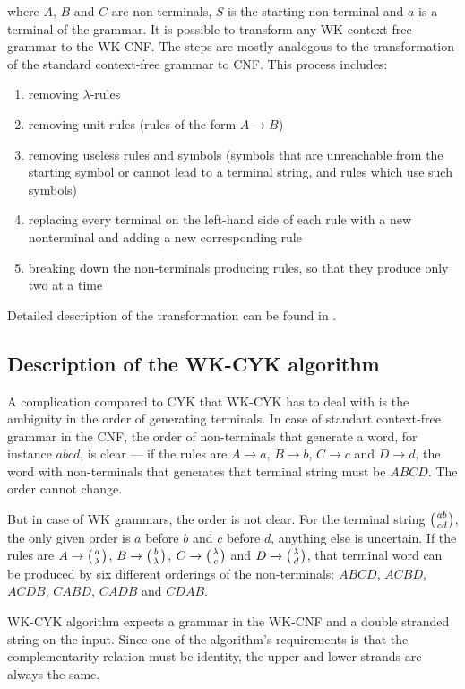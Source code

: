 where $A$, $B$ and $C$ are non-terminals, $S$ is the starting non-terminal and $a$ is a terminal of the grammar. It is possible to transform any WK context-free grammar to the WK-CNF. The steps are mostly analogous to the transformation of the standard context-free grammar to CNF. This process includes:

\begin{enumerate}
  \item{removing $\lambda$-rules}
  \item{removing unit rules (rules of the form $A \rightarrow B$)}
  \item{removing useless rules and symbols (symbols that are unreachable from the starting symbol or cannot lead to a terminal string, and rules which use such symbols)}
  \item{replacing every terminal on the left-hand side of each rule with a new nonterminal and adding a new corresponding rule}
  \item{breaking down the non-terminals producing rules, so that they produce only two at a time}
\end{enumerate}

Detailed description of the transformation can be found in \cite{WK_CYK}.

\subsection{Description of the WK-CYK algorithm}
A complication compared to CYK that WK-CYK has to deal with is the ambiguity in the order of generating terminals. In case of standart context-free grammar in the CNF, the order of non-terminals that generate a word, for instance $abcd$, is clear --- if the rules are $A \rightarrow a$, $B \rightarrow b$, $C \rightarrow c$ and $D \rightarrow d$, the word with non-terminals that generates that terminal string must be $ABCD$. The order cannot change.

But in case of WK grammars, the order is not clear. For the terminal string $\wkpair{ab}{cd}$, the only given order is $a$ before $b$ and $c$ before $d$, anything else is uncertain. If the rules are $A \rightarrow \wkpair{a}{\lambda}$, $B \rightarrow \wkpair{b}{\lambda}$, $C \rightarrow \wkpair{\lambda}{c}$ and $D \rightarrow \wkpair{\lambda}{d}$, that terminal word can be produced by six different orderings of the non-terminals:
$ABCD$, $ACBD$, $ACDB$, $CABD$, $CADB$ and $CDAB$.

WK-CYK algorithm expects a grammar in the WK-CNF and a double stranded string on the input. Since one of the algorithm's requirements is that the complementarity relation must be identity, the upper and lower strands are always the same.

